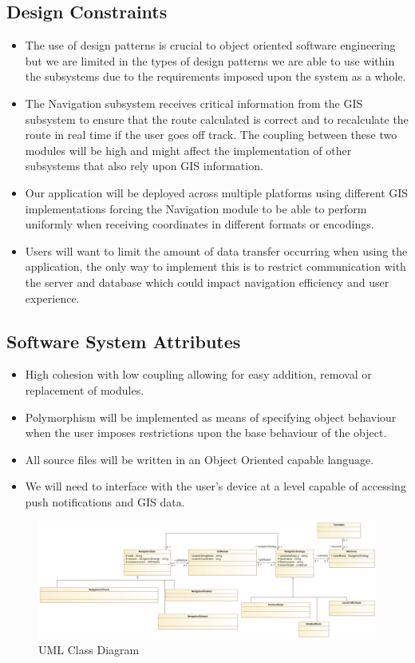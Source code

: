 	\subsection{Design Constraints}
	\begin{itemize}
		\small
		\item The use of design patterns is crucial to object oriented software engineering but we are limited 
			in the types of design patterns we are able to use within the subsystems due to the requirements 
			imposed upon the system as a whole.
		\item The Navigation subsystem receives critical information from the GIS subsystem to ensure that the route
			calculated is correct and to recalculate the route in real time if the user goes off track. The coupling between these two modules will be high and might affect the implementation of other subsystems that also rely upon GIS information.
		\item Our application will be deployed across multiple platforms using different GIS implementations forcing the Navigation module to be able to perform uniformly when receiving coordinates in different formats or encodings.
		\item Users will want to limit the amount of data transfer occurring when using the application, the only way to implement this is to restrict communication with the server and database which could impact navigation efficiency and user experience.
	\end{itemize}
	
	\subsection{Software System Attributes}
	\begin{itemize}
		\small 
		\item High cohesion with low coupling allowing for easy addition, removal or replacement of modules.
		\item Polymorphism will be implemented as means of specifying object behaviour when the user imposes restrictions upon the base behaviour of the object.
		\item All source files will be written in an Object Oriented capable language.
		\item We will need to interface with the user's device at a level capable of accessing push notifications and 
		 GIS data.
	\end{itemize}
	
	\begin{figure}
	  \includegraphics[width=\linewidth]{NavigationModuleClassDiagram(v2_noMethods).png}
	  \caption{UML Class Diagram}
	  \label{fig:UML1}
	\end{figure}
	
